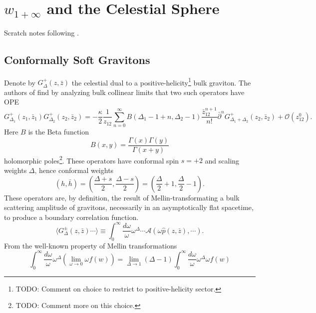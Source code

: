 \documentclass[11pt,letterpaper]{article}
\newcommand{\LP}{\left(}
\newcommand{\RP}{\right)}
\newcommand{\mc}[1]{\mathcal{#1}}
\newcommand{\D}{\partial}
\begin{document}
\section{$w_{1 + \infty}$ and the Celestial Sphere}
Scratch notes following \cite{Strominger:2021mtt}.


\subsection{Conformally Soft Gravitons}
Denote by $G^+_\Delta(z, \bar{z})$ the celestial dual to a positive-helicity\footnote{TODO: Comment on choice to restrict to positive-helicity sector.} bulk graviton. The authors of \cite{Guevara:2021abz} find by analyzing bulk collinear limits that two such operators have OPE \begin{equation}\label{gravitonOPE}
G_{\Delta_1}^+ (z_1, \bar{z}_1) G_{\Delta_2}^+ (z_2, \bar{z}_2) = - \frac{\kappa}{2} \frac{1}{z_{12}} \sum_{n =0 }^\infty B(\Delta_1 - 1 + n, \Delta_2 - 1) \frac{\bar{z}_{12}^{n+1}}{n!} \bar{\D}^n G^+_{\Delta_1 + \Delta_2} (z_2, \bar{z}_2) + \mc{O}\LP z_{12}^0 \RP.
\end{equation}
Here $B$ is the Beta function \begin{equation}
B(x,y) = \frac{\Gamma(x) \Gamma(y)}{\Gamma(x+y)}
\end{equation}
holomorphic poles\footnote{TODO: Comment more on this choice.}. These operators have conformal spin $s = +2$ and scaling weights $\Delta$, hence conformal weights \begin{equation}
\LP h, \bar{h} \RP = \LP \frac{\Delta + s}{2}, \frac{\Delta - s}{2} \RP = \LP \frac{\Delta}{2} + 1, \frac{\Delta}{2} - 1 \RP.
\end{equation}
These operators are, by definition, the result of Mellin-transformating a bulk scattering amplitude of gravitons, necessarily in an asymptotically flat spacetime, to produce a boundary correlation function. \begin{equation}
\langle G_\Delta^\pm(z, \bar{z}) \cdots \rangle \equiv \int_0^\infty \frac{d \omega}{\omega} \omega^\Delta \cdots \mc{A} \LP \omega \hat{p}(z, \bar{z}),  \cdots \RP.
\end{equation}
From the well-known property of Mellin transformations \begin{equation}
\int_0^\infty \frac{d \omega}{\omega} \omega^\Delta \LP \lim_{\omega \to 0} \omega f(w) \RP = \lim_{\Delta \to 1} (\Delta - 1) \int_0^\infty \frac{d \omega}{\omega} \omega^\Delta \omega f(w)
\end{equation}
\end{document}
